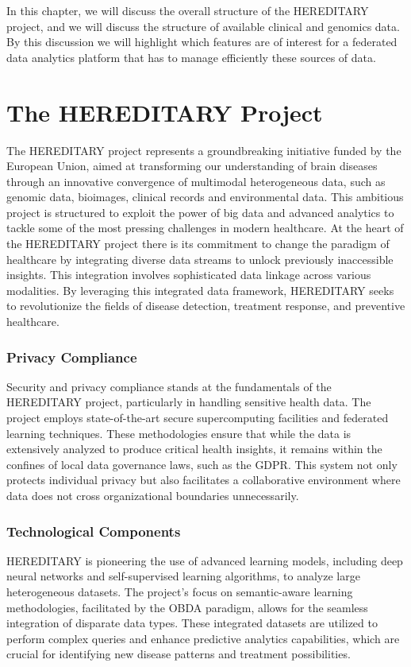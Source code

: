 In this chapter, we will discuss the overall structure of the \ac{HEREDITARY} project, and we will discuss the structure of available clinical and genomics data. By this discussion we will highlight which features are of interest for a federated data analytics platform that has to manage efficiently these sources of data.

\section{The HEREDITARY Project}

The \ac{HEREDITARY} project represents a groundbreaking initiative funded by the European Union, aimed at transforming our understanding of brain diseases through an innovative convergence of multimodal heterogeneous data, such as genomic data, bioimages, clinical records and environmental data. This ambitious project is structured to exploit the power of big data and advanced analytics to tackle some of the most pressing challenges in modern healthcare.
At the heart of the \ac{HEREDITARY} project there is its commitment to change the paradigm of healthcare by integrating diverse data streams to unlock previously inaccessible insights. This integration involves sophisticated data linkage across various modalities. By leveraging this integrated data framework, \ac{HEREDITARY} seeks to revolutionize the fields of disease detection, treatment response, and preventive healthcare.
\subsubsection{Privacy Compliance}
Security and privacy compliance stands at the fundamentals of the \ac{HEREDITARY} project, particularly in handling sensitive health data. The project employs state-of-the-art secure supercomputing facilities and federated learning techniques. These methodologies ensure that while the data is extensively analyzed to produce critical health insights, it remains within the confines of local data governance laws, such as the \ac{GDPR}. This system not only protects individual privacy but also facilitates a collaborative environment where data does not cross organizational boundaries unnecessarily.
\subsubsection{Technological Components}
\ac{HEREDITARY} is pioneering the use of advanced learning models, including deep neural networks and self-supervised learning algorithms, to analyze large heterogeneous datasets. The project's focus on semantic-aware learning methodologies, facilitated by the \ac{OBDA} paradigm, allows for the seamless integration of disparate data types. These integrated datasets are utilized to perform complex queries and enhance predictive analytics capabilities, which are crucial for identifying new disease patterns and treatment possibilities.
